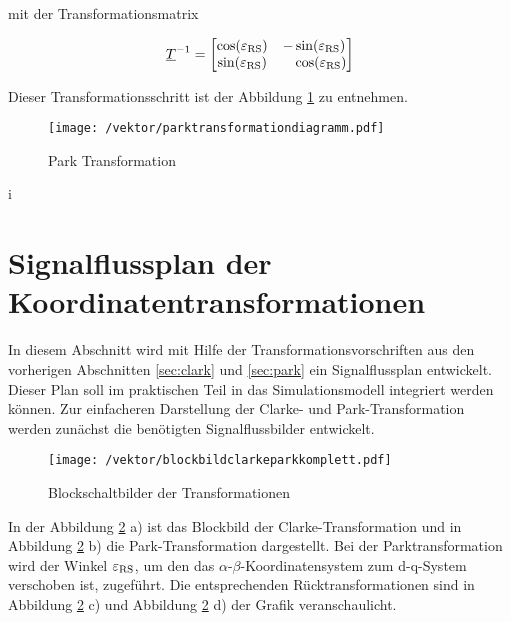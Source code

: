 mit der Transformationsmatrix

\begin{align}
	\underline{T}^{-1} =
	\begin{bmatrix}
		\cos({\varepsilon_{\mathrm{RS}}}) & -\sin({\varepsilon_{\mathrm{RS}}}) \\
		\sin({\varepsilon_{\mathrm{RS}}}) & ~~~\cos({\varepsilon_{\mathrm{RS}}})
	\end{bmatrix}
	\label{parkmatrixinvers}
\end{align}

Dieser Transformationsschritt ist der Abbildung \ref{fig:parktransformationdiagramm} zu entnehmen.


\begin{figure}[h]
	\centering
	\texttt{[image: /vektor/parktransformationdiagramm.pdf]}
	\label{fig:parktransformationdiagramm}
	\caption{Park Transformation}
\end{figure}
i
\newpage

\section{Signalflussplan der Koordinatentransformationen}\label{sec:signalflussplan}

In diesem Abschnitt wird mit Hilfe der Transformationsvorschriften aus den vorherigen Abschnitten \ref{sec:clark} und \ref{sec:park} ein Signalflussplan entwickelt.
Dieser Plan soll im praktischen Teil in das Simulationsmodell integriert werden können.
Zur einfacheren Darstellung der Clarke- und Park-Transformation werden zunächst die benötigten Signalflussbilder entwickelt.

\begin{figure}[h]
	\centering
	\texttt{[image: /vektor/blockbildclarkeparkkomplett.pdf]}
	\label{fig:blockbildclarkeparkkomplett}
	\caption{Blockschaltbilder der Transformationen}
\end{figure}

In der Abbildung \ref{fig:blockbildclarkeparkkomplett} a) ist das Blockbild der Clarke-Transformation und in Abbildung \ref{fig:blockbildclarkeparkkomplett} b) die Park-Transformation dargestellt. 
Bei der Parktransformation wird der Winkel $\varepsilon_{\mathrm{RS}}$, um den das $\alpha$-$\beta$-Koordinatensystem zum d-q-System verschoben ist, zugeführt.
Die entsprechenden Rücktransformationen sind in Abbildung \ref{fig:blockbildclarkeparkkomplett} c) und Abbildung \ref{fig:blockbildclarkeparkkomplett} d) der Grafik veranschaulicht.

